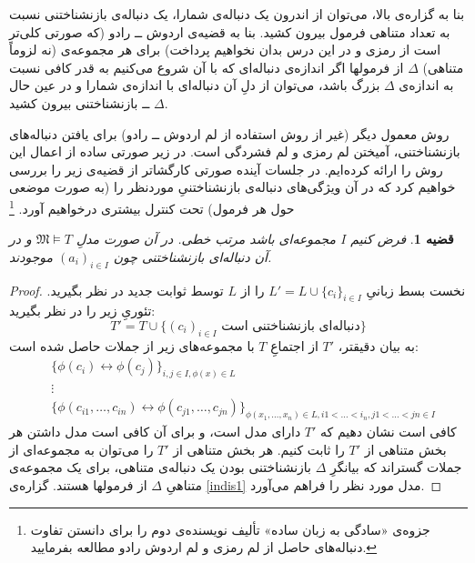 \documentclass[12pt,a4paper]{report}
\theoremstyle{colorhead}
\newtheorem{thm}{قضیه}
\begin{document}
بنا به گزاره‌ی بالا، می‌توان از اندرون یک دنباله‌ی شمارا، یک دنباله‌ی بازنشناختنی نسبت به تعداد متناهی فرمول بیرون کشید. بنا به قضیه‌ی اردوش ــ رادو (که صورتی کلی‌تر است از رمزی و در این درس بدان نخواهیم پرداخت)
برای هر مجموعه‌ی
(نه لزوماً متناهی)
$\Delta$
از فرمولها 
اگر اندازه‌ی دنباله‌ای که با آن شروع می‌کنیم به قدر کافی
نسبت به اندازه‌ی
$\Delta$
 بزرگ باشد، می‌توان از دلِ آن دنباله‌ای با اندازه‌ی شمارا و در عین حال
$\Delta$ ــ
بازنشناختنی بیرون کشید.
\par 
روش معمول
دیگر (غیر از روش استفاده از لم اردوش ــ رادو)
 برای یافتن دنباله‌های بازنشناختنی،‌ آمیختن لم رمزی و لم فشردگی است. در زیر 
صورتی ساده از اعمال این روش را ارائه کرده‌ایم. در جلسات آینده صورتی کارگشاتر از قضیه‌ی زیر را بررسی خواهیم کرد که در آن ویژگی‌های دنباله‌ی بازنشناختنیِ موردنظر را (به صورت موضعی حول هر فرمول)
تحت کنترل بیشتری درخواهیم آورد. 
\footnote{جزوه‌ی «سادگی به زبان ساده»‌ تألیف نویسنده‌ی دوم را 
برای دانستن  تفاوت دنباله‌های حاصل از لم رمزی و لم اردوش رادو مطالعه بفرمایید. 
}
\begin{thm}
\label{indis2}
فرض کنیم
$I$
مجموعه‌ای باشد مرتب خطی. در آن صورت مدلِ
$\mathfrak{M}\models T$
و در آن دنباله‌ای بازنشناختنی چون
$(a_i)_{i\in I}$
موجودند. 
\end{thm}
\begin{proof}
نخست بسط زبانیِ
$L'=L\cup \{c_i\}_{i\in I}$
را از
$L$
توسط ثوابت جدید در نظر بگیرید. تئوریِ
زیر را در نظر بگیرید:
\[
T'=T\cup \{\text{$(c_i)_{i\in I}$ دنباله‌ای بازنشناختنی است}\}
\]
به بیان دقیقتر،
$T'$
از اجتماعِ
$T$
با مجموعه‌های زیر از جملات حاصل شده است:
\begin{align*}
& \{\phi(c_i)\leftrightarrow \phi(c_j) \}_{i,j\in I, \phi(x)\in L}
\\
& \vdots
\\
& \{\phi(c_{i1},\ldots, c_{in})\leftrightarrow \phi(c_{j1},\ldots,c_{jn})\}_{\phi(x_1,\ldots,x_n)\in L, i1<\ldots<i_n, j1<\ldots<jn\in I}
\end{align*}
کافی است نشان دهیم که
$T'$
دارای مدل است، و برای آن کافی است مدل داشتن هر بخش متناهی از
$T'$
را ثابت کنیم. هر بخش متناهی از 
$T'$
را می‌توان به مجموعه‌ای از جملات گستراند که بیانگرِ 
$\Delta$
بازنشناختنی بودن یک دنباله‌ی متناهی، برای یک مجموعه‌ی متناهیِ
$\Delta$
از فرمولها هستند. گزاره‌ی
\ref{indis1}
مدل مورد نظر را فراهم می‌آورد.
\end{proof}
\newpage 
\end{document}
